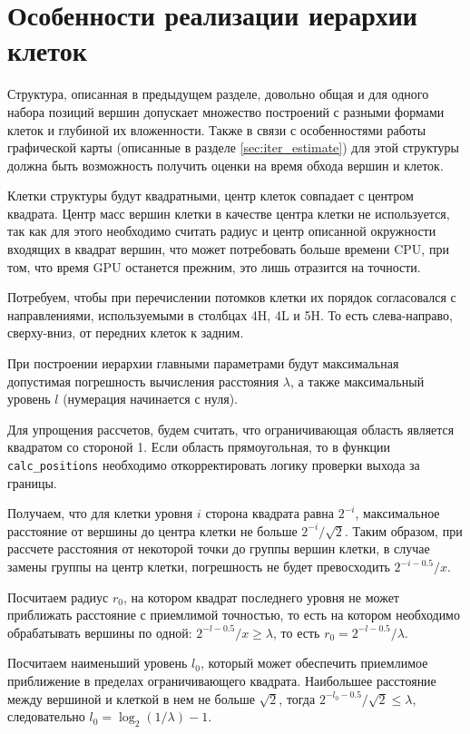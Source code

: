 \section{Особенности реализации иерархии клеток}
\label{sec:cells_implementation}

Структура, описанная в предыдущем разделе, довольно общая и для одного набора позиций вершин допускает множество построений с разными формами клеток и глубиной их вложенности. Также в связи с особенностями работы графической карты (описанные в разделе \ref{sec:iter_estimate}) для этой структуры должна быть возможность получить оценки на время обхода вершин и клеток.

Клетки структуры будут квадратными, центр клеток совпадает с центром квадрата. Центр масс вершин клетки в качестве центра клетки не используется, так как для этого необходимо считать радиус и центр описанной окружности входящих в квадрат вершин, что может потребовать больше времени CPU, при том, что время GPU останется прежним, это лишь отразится на точности.

Потребуем, чтобы при перечислении потомков клетки их порядок согласовался с направлениями, используемыми в столбцах 4H, 4L и 5H. То есть слева-направо, сверху-вниз, от передних клеток к задним.

При построении иерархии главными параметрами будут максимальная допустимая погрешность вычисления расстояния $\lambda$, а также максимальный уровень $l$ (нумерация начинается с нуля).

Для упрощения рассчетов, будем считать, что ограничивающая область является квадратом со стороной 1. Если область прямоугольная, то в функции \texttt{calc\_positions} необходимо откорректировать логику проверки выхода за границы.

Получаем, что для клетки уровня $i$ сторона квадрата равна $2^{-i}$, максимальное расстояние от вершины до центра клетки не больше $2^{-i} / \sqrt{2}$. Таким образом, при рассчете расстояния от некоторой точки до группы вершин клетки, в случае замены группы на центр клетки, погрешность не будет превосходить $2^{-i - 0.5} / x$.

Посчитаем радиус $r_0$, на котором квадрат последнего уровня не может приближать расстояние с приемлимой точностью, то есть на котором необходимо обрабатывать вершины по одной:  $2^{-l - 0.5} / x \ge \lambda$, то есть $r_0 = 2^{-l - 0.5} / \lambda$.

Посчитаем наименьший уровень $l_0$, который может обеспечить приемлимое приближение в пределах ограничивающего квадрата. Наибольшее расстояние между вершиной и клеткой в нем не больше $\sqrt{2}$, тогда $2^{-l_0 - 0.5} / \sqrt{2} \le \lambda$, следовательно $l_0 =  \log_2(1 / \lambda) - 1$.

